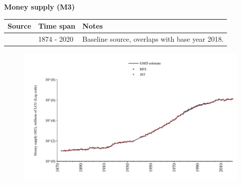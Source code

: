 \documentclass[12pt,a4paper,landscape]{article}
\begin{document}
\begin{adjustbox}{max totalsize={\paperwidth}{\paperheight},center}
\begin{minipage}[t][\textheight][t]{\textwidth}
\vspace*{0.5cm}
{}
\begin{center}
{\Large\bfseries Money supply (M3)}
\end{center}
\vspace{0.5cm}
\begin{table}[H]
\centering
\small
\begin{tabular}{|l|l|l|}
\hline
\textbf{Source} & \textbf{Time span} & \textbf{Notes} \\
\hline
\rowcolor{white}\cite{JST}& 1874 - 2020 &Baseline source, overlaps with base year 2018. \\
\hline
\end{tabular}
\end{table}
\begin{figure}[H]
\centering
\includegraphics[width=\textwidth,height=0.6\textheight,keepaspectratio]{graphs/ESP_M3.pdf}
\end{figure}
\end{minipage}
\end{adjustbox}
\end{document}

